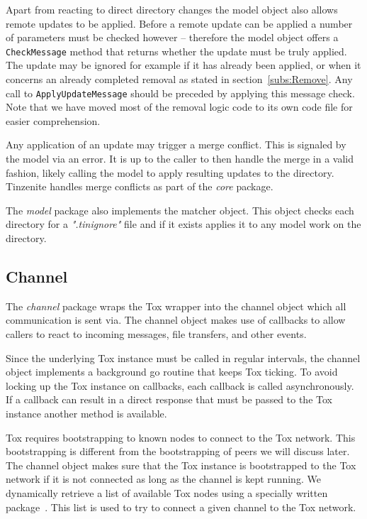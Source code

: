 Apart from reacting to direct directory changes the model object also allows remote updates to be applied.
Before a remote update can be applied a number of parameters must be checked however -- therefore the model object offers a \texttt{CheckMessage} method that returns whether the update must be truly applied.
The update may be ignored for example if it has already been applied, or when it concerns an already completed removal as stated in section~\ref{subs:Remove}.
Any call to \texttt{ApplyUpdateMessage} should be preceded by applying this message check.
Note that we have moved most of the removal logic code to its own code file for easier comprehension.

Any application of an update may trigger a merge conflict.
This is signaled by the model via an error.
It is up to the caller to then handle the merge in a valid fashion, likely calling the model to apply resulting updates to the directory.
Tinzenite handles merge conflicts as part of the \emph{core} package.

The \emph{model} package also implements the matcher object.
This object checks each directory for a \textit{".tinignore"} file and if it exists applies it to any model work on the directory.

\subsection{Channel}
\label{sub:Channel}

The \emph{channel} package wraps the Tox wrapper into the channel object which all communication is sent via.
The channel object makes use of callbacks to allow callers to react to incoming messages, file transfers, and other events.

Since the underlying Tox instance must be called in regular intervals, the channel object implements a background go routine that keeps Tox ticking.
To avoid locking up the Tox instance on callbacks, each callback is called asynchronously.
If a callback can result in a direct response that must be passed to the Tox instance another method is available.

Tox requires bootstrapping to known nodes to connect to the Tox network.
This bootstrapping is different from the bootstrapping of peers we will discuss later.
The channel object makes sure that the Tox instance is bootstrapped to the Tox network if it is not connected as long as the channel is kept running.
We dynamically retrieve a list of available Tox nodes using a specially written package~\cite{web:site:github:tox-dynboot}.
This list is used to try to connect a given channel to the Tox network.

